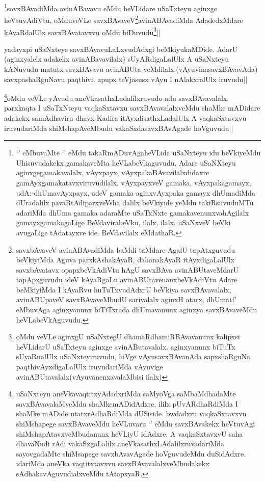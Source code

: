 \begin{artha}
\footnote{`\stext' eMbuvaMte `\stext' eMdu takaRmADuvAgaheVLida uSaNxteyu idu beVkiyeMdu Uhisuvudakekx gamakaveMta heVLabeVkaguvudu, Adare uSaNXteyu aginxgegamakavalalx, vAyxpayx, vAyxpakaBAvavilalxdidaxre gamAyxgamakatavxviruvudilalx, vAyxpayxveV gamaka, vAyxpakagamayx, udA:-dhUmavAyxpayx, adeV gamaka aginxvAyxpaka gamayx dhUmadiMda dUradalilx pavaRtAdiparxveVsha dalilx beVkiyide yeMdu takiRsuvuduMTu adariMda dhUma gamaka adaraMte uSaTxNxte gamakavenunxvahAgilalx gamayxgamakagaLige BeVdavirabeVku, ilalx, ilalx, uSaNxveV beVki avugaLige tAdatayxve ide. BeVdavilalx eMdathaR.}savxBAvadiMda avinABavavu eMdu heVLidare uSaTxteyu aginxge heVtuvAdiVtu, oMduveVLe savxBAvaveV\footnote{savxbAvaveV avinABAvadiMda baMdi taMdare AgalU tapAtxguvudu beVkiyiMda Aguva parxkAshakAyaR, dahanakAyaR itAyxdigaLalUlx savxbAvatavx opapxbeVkAdiVtu hAgU savxBAva avinABUtaveMdarU tapApxguvudu ideV kAyaRgaLu avinABUtavenanxbeVkAdiVtu Adare beMkiyiMda I kAyaRvu huTuTxvudAdxrU beVkiya savxBAvavalalx, avinABUpaveV savxBAvaveMbudU sariyalalx aginxH atarx, dhUmatf' eMbuvAga aginxyanunx biTiTxrada dhUmavanunx aginxya savxBAvaveMdu heVLabeVkAguvudu.}avinABAvadiMda AdadedxMdare kAyaRdalUlx savxBAvatavxvu oMdu biDuvudu\footnote{oMdu veVLe aginxgU uSaNxtegU dhamaRdhamiRBAvavanunx kalipxsi heVLidarU uSaTxteyu aginxge avinAButavalalx. aginxyanunx biTuTx sUyaRnalUlx uSaNxteyiruvudu, hiVge vAyusavxBAvanAda sapxshaRguNa paqthivAyxdigaLalUlx iruvudariMda vAyuvige avinABUtavalalx(vAyuvanenxavalaMbisi ilalx)}||
\end{artha}

\begin{artha}
yadayxpi uSaNxteye savxBAvavuLaLxvudAdxgi beMkiyukaMDide. AdarU (aginxyalelx adakekx avinABavavilalx) sUyARdigaLalUlx A uSaNxteyu kANuvudu matutx savxBAvavu avinABUta veMdilalx.(vAyuvinasavxBAvavAda) savxpashaRguNavu paqthivi, apupx teVjasusx vAyu I nAlakxralUlx iruvudu||
\end{artha}

\begin{artha}
\footnote{uSaNxteyu aneVkavaqtitxyAdadxriMda saMyoVga saMbaMdhadaMte savxBAvavalaMveMdu shaMkemADidAdxre, ililx pUvARdhaRdiMda I shaMke mADide utatxrAdhaRdiMda dUSiside. bwdadxru vaqkaSxtavxvu shiMshapege savxBAvaveMdu heVLuvaru `\stext' eMdu savxBAvakekx heVtuvAgi shiMshapAtavxveMbudanunx heVLiyU idAdxre. A vaqkaSxtavxvU saha dhavaNudi rAdi vakaSxgaLalilx aneVkasathxLAdalilxruvadariMda sayovgadaMte shiMsapege savxbAvavAgade hoVguvudeMdu duSidAdxre. idariMda aneVka vaqtitxtavxvu savxBAvavalalxveMbudakekx sAdhakavAguvudialxveMdu tAtapxyaR.}oMdu veVLe yAvudu aneVkasathxLadalilxruvudo adu savxBAvavalalx, parxkaqta I uSaTxNteyu vaqkaSxtavxu savxBAvavalalxveMdu shaMke mADidare adakekx samAdhaviru dhavx Kadira itAyxdisathxLadalUlx A vaqkaSxtavxvu iruvudariMda shiMshapAveMbudu vakaSxdasavxBAvAgade hoVguvudu||
\end{artha}

